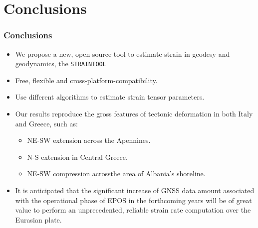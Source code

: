 \section{Conclusions}
 

\begin{frame}
 \frametitle{Conclusions}
 \label{ch5:concl}
  
  \begin{itemize}
    \item We propose a new, open-source tool to estimate strain in geodesy and geodynamics, the \texttt{STRAINTOOL}
    \item Free, flexible and cross-platform-compatibility.
    \item Use different algorithms to estimate strain tensor parameters.
    \item Οur results reproduce the gross features of tectonic deformation in both Italy and Greece, such as:
    \begin{itemize}
      \item NE-SW extension across the Apennines.
      \item N-S extension in Central Greece.
      \item NE-SW compression acrossthe area of Albania's shoreline.
    \end{itemize}
    \item It is anticipated that the significant increase of GNSS data amount associated with the operational phase of EPOS in the forthcoming years will be of great value to perform an unprecedented, reliable strain rate computation over the Eurasian plate.
  \end{itemize}
\end{frame}
\note{}

